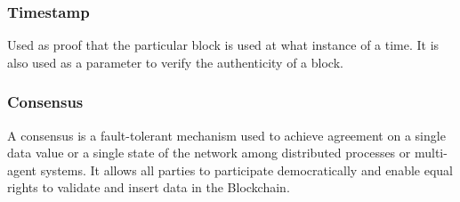 \subsubsection{Timestamp}
Used as proof that the particular block is used at what instance of a time. It is also used as a parameter to verify the authenticity of a block.

\subsubsection{Consensus}
\label{consensus}
A consensus is a fault-tolerant mechanism used to achieve agreement on a single data value or a single state of the network among distributed processes or multi-agent systems. It allows all parties to participate democratically and enable equal rights to validate and insert data in the Blockchain.

